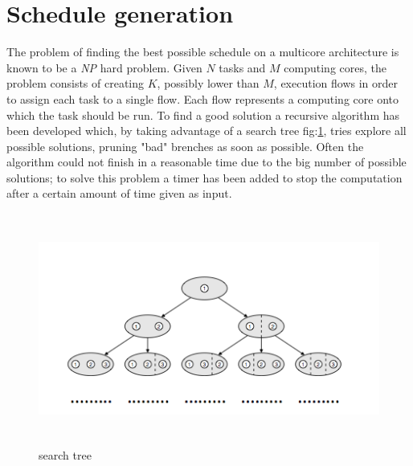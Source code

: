 \documentclass[a4paper,11pt,oneside]{book}
\begin{document}
\section{Schedule generation}

The problem of finding the best possible schedule on a multicore architecture is known to be a \emph{NP} hard problem. Given $N$ tasks and $M$ computing cores, the problem consists of creating $K$, possibly lower than $M$, execution flows in order to assign each task to a single flow. Each flow represents a computing core onto which the task should be run. To find a good solution a recursive algorithm has been developed which, by taking advantage of a search tree fig:\ref{search_tree}, tries explore all possible solutions, pruning "bad" brenches as soon as possible. Often the algorithm could not finish in a reasonable time due to the big number of possible solutions; to solve this problem a timer has been added to stop the computation after a certain amount of time given as input. \\

\begin{figure}[H]
\centering
\includegraphics[width = 130mm, height = 76mm]{search_tree.png}
\caption{search tree}
\label{search_tree}
\end{figure}
\end{document}
